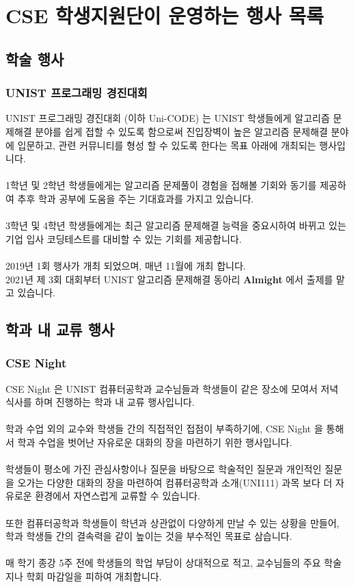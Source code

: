 \newpage
\section{CSE 학생지원단이 운영하는 행사 목록}
\subsection{학술 행사}
\subsubsection{UNIST 프로그래밍 경진대회}
UNIST 프로그래밍 경진대회 (이하 Uni-CODE) 는 UNIST 학생들에게 알고리즘 문제해결 분야를 쉽게 접할 수 있도록 함으로써
진입장벽이 높은 알고리즘 문제해결 분야에 입문하고, 관련 커뮤니티를 형성 할 수 있도록 한다는 목표 아래에 개최되는 행사입니다.\\
\\
1학년 및 2학년 학생들에게는 알고리즘 문제풀이 경험을 접해볼 기회와 동기를 제공하여 추후 학과 공부에 도움을 주는 기대효과를 가지고 있습니다.\\
\\
3학년 및 4학년 학생들에게는 최근 알고리즘 문제해결 능력을 중요시하여 바뀌고 있는 기업 입사
코딩테스트를 대비할 수 있는 기회를 제공합니다.\\
\\
2019년 1회 행사가 개최 되었으며, 매년 11월에 개최 합니다.\\
2021년 제 3회 대회부터 UNIST 알고리즘 문제해결 동아리 \textbf{Almight} 에서 출제를 맡고 있습니다.

\subsection{학과 내 교류 행사}
\subsubsection{CSE Night}
CSE Night 은 UNIST 컴퓨터공학과 교수님들과 학생들이 같은 장소에 모여서 저녁 식사를 하며 진행하는 학과 내 교류 행사입니다.\\
\\
학과 수업 외의 교수와 학생들 간의 직접적인 접점이 부족하기에, CSE Night 을 통해서 학과 수업을 벗어난 자유로운 대화의 장을 마련하기 위한 행사입니다.\\
\\
학생들이 평소에 가진 관심사항이나 질문을 바탕으로 학술적인 질문과 개인적인 질문을 오가는 다양한 대화의 장을 마련하여 컴퓨터공학과 소개(UNI111) 과목 보다 더 자유로운 환경에서 자연스럽게 교류할 수 있습니다.\\
\\
또한 컴퓨터공학과 학생들이 학년과 상관없이 다양하게 만날 수 있는 상황을 만들어, 학과 학생들 간의 결속력을 같이 높이는 것을 부수적인 목표로 삼습니다.\\
\\
매 학기 종강 5주 전에 학생들의 학업 부담이 상대적으로 적고, 교수님들의 주요 학술지나 학회 마감일을 피하여 개최합니다.\\